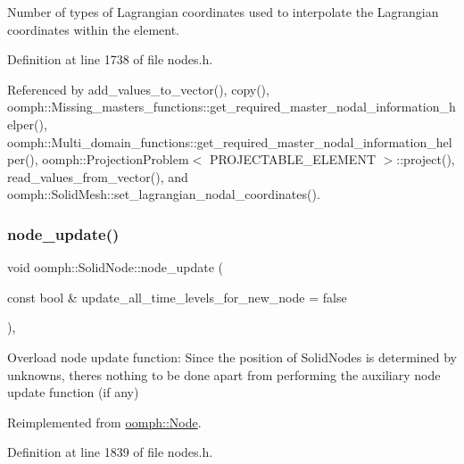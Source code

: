 Number of types of Lagrangian coordinates used to interpolate the Lagrangian coordinates within the element. 



Definition at line 1738 of file nodes.\+h.



Referenced by add\+\_\+values\+\_\+to\+\_\+vector(), copy(), oomph\+::\+Missing\+\_\+masters\+\_\+functions\+::get\+\_\+required\+\_\+master\+\_\+nodal\+\_\+information\+\_\+helper(), oomph\+::\+Multi\+\_\+domain\+\_\+functions\+::get\+\_\+required\+\_\+master\+\_\+nodal\+\_\+information\+\_\+helper(), oomph\+::\+Projection\+Problem$<$ P\+R\+O\+J\+E\+C\+T\+A\+B\+L\+E\+\_\+\+E\+L\+E\+M\+E\+N\+T $>$\+::project(), read\+\_\+values\+\_\+from\+\_\+vector(), and oomph\+::\+Solid\+Mesh\+::set\+\_\+lagrangian\+\_\+nodal\+\_\+coordinates().

\mbox{\label{classoomph_1_1SolidNode_ae66793af1a576edd29523ffb98b7225c}} 
\subsubsection{\texorpdfstring{node\+\_\+update()}{node\_update()}}
{\footnotesize\ttfamily void oomph\+::\+Solid\+Node\+::node\+\_\+update (\begin{DoxyParamCaption}\item[{const bool \&}]{update\+\_\+all\+\_\+time\+\_\+levels\+\_\+for\+\_\+new\+\_\+node = {\ttfamily false} }\end{DoxyParamCaption})\hspace{0.3cm}{\ttfamily [inline]}, {\ttfamily [virtual]}}



Overload node update function\+: Since the position of Solid\+Nodes is determined by unknowns, there\textquotesingle{}s nothing to be done apart from performing the auxiliary node update function (if any) 



Reimplemented from \hyperlink{classoomph_1_1Node_aecf8c979266300d3609de2b4ddfa3cc8}{oomph\+::\+Node}.



Definition at line 1839 of file nodes.\+h.

\mbox{\label{classoomph_1_1SolidNode_ab62f67b20caf5db02a81d794a32f049b}} 
